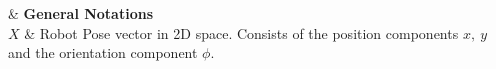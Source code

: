  {

& \textbf{General Notations} \\

$X$ & Robot Pose vector in 2D space. Consists of the position components $x,\ y$ and the orientation component $\phi$. \\


}
